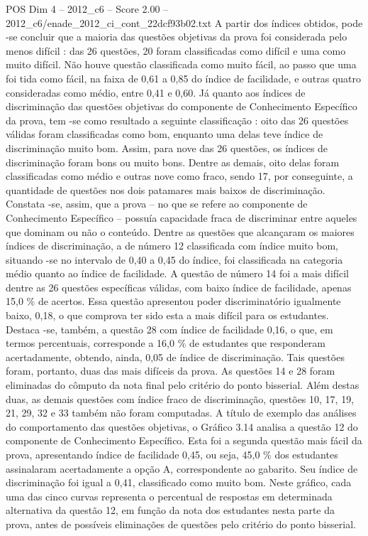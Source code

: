 \begin{textsample}{POS Dim 4 – 2012\_c6 – Score 2.00 – 2012\_c6/enade\_2012\_ci\_cont\_22dcf93b02.txt}
A partir dos índices obtidos, pode -se concluir que a maioria das questões objetivas da prova foi considerada pelo menos difícil : das 26 questões, 20 foram classificadas como difícil e uma como muito difícil.
Não houve questão classificada como muito fácil, ao passo que uma foi tida como fácil, na faixa de 0,61 a 0,85 do índice de facilidade, e outras quatro consideradas como médio, entre 0,41 e 0,60.
Já quanto aos índices de discriminação das questões objetivas do componente de Conhecimento Específico da prova, tem -se como resultado a seguinte classificação : oito das 26 questões válidas foram classificadas como bom, enquanto uma delas teve índice de discriminação muito bom.
Assim, para nove das 26 questões, os índices de discriminação foram bons ou muito bons.
Dentre as demais, oito delas foram classificadas como médio e outras nove como fraco, sendo 17, por conseguinte, a quantidade de questões nos dois patamares mais baixos de discriminação.
Constata -se, assim, que a prova – no que se refere ao componente de Conhecimento Específico – possuía capacidade fraca de discriminar entre aqueles que dominam ou não o conteúdo.
Dentre as questões que alcançaram os maiores índices de discriminação, a de número 12 classificada com índice muito bom, situando -se no intervalo de 0,40 a 0,45 do índice, foi classificada na categoria médio quanto ao índice de facilidade.
A questão de número 14 foi a mais difícil dentre as 26 questões específicas válidas, com baixo índice de facilidade, apenas 15,0 \% de acertos.
Essa questão apresentou poder discriminatório igualmente baixo, 0,18, o que comprova ter sido esta a mais difícil para os estudantes.
Destaca -se, também, a questão 28 com índice de facilidade 0,16, o que, em termos percentuais, corresponde a 16,0 \% de estudantes que responderam acertadamente, obtendo, ainda, 0,05 de índice de discriminação.
Tais questões foram, portanto, duas das mais difíceis da prova.
As questões 14 e 28 foram eliminadas do cômputo da nota final pelo critério do ponto bisserial.
Além destas duas, as demais questões com índice fraco de discriminação, questões 10, 17, 19, 21, 29, 32 e 33 também não foram computadas.
A título de exemplo das análises do comportamento das questões objetivas, o Gráfico 3.14 analisa a questão 12 do componente de Conhecimento Específico.
Esta foi a segunda questão mais fácil da prova, apresentando índice de facilidade 0,45, ou seja, 45,0 \% dos estudantes assinalaram acertadamente a opção A, correspondente ao gabarito.
Seu índice de discriminação foi igual a 0,41, classificado como muito bom.
Neste gráfico, cada uma das cinco curvas representa o percentual de respostas em determinada alternativa da questão 12, em função da nota dos estudantes nesta parte da prova, antes de possíveis eliminações de questões pelo critério do ponto bisserial.

\end{textsample}
